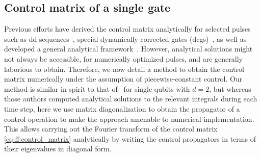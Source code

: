 \subsection{Control matrix of a single gate}\label{subsec:ff:theory:control_matrix:pulse}
Previous efforts have derived the control matrix analytically for selected pulses such as \gls{dd} sequences~\cite{Cywinski2008}, special dynamically corrected gates (\glspl{dcg})~\cite{Gungordu2018}, as well as developed a general analytical framework~\cite{Green2012,Green2013}.
However, analytical solutions might not always be accessible, \eg for numerically optimized pulses, and are generally laborious to obtain.
Therefore, we now detail a method to obtain the control matrix numerically under the assumption of piecewise-constant control.
Our method is similar in spirit to that of~\textcite{Green2012} for single qubits with $d=2$, but whereas those authors computed analytical solutions to the relevant integrals during each time step, here we use matrix diagonalization to obtain the propagator of a control operation to make the approach amenable to numerical implementation.
This allows carrying out the Fourier transform of the control matrix \cref{eq:ff:control_matrix} analytically by writing the control propagators in terms of their eigenvalues in diagonal form.

